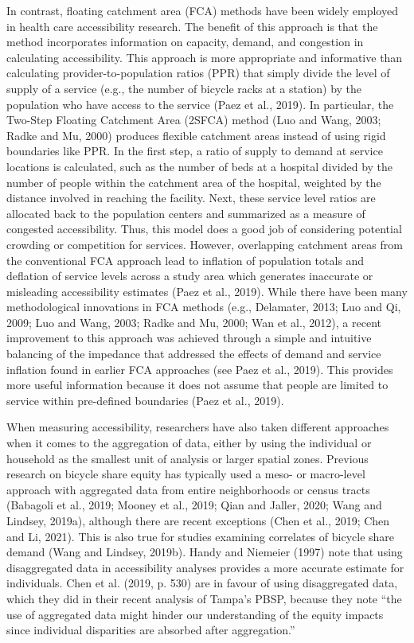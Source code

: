 \documentclass[]{elsarticle} %
\begin{document}
In contrast, floating catchment area (FCA) methods have been widely
employed in health care accessibility research. The benefit of this
approach is that the method incorporates information on capacity,
demand, and congestion in calculating accessibility. This approach is
more appropriate and informative than calculating provider-to-population
ratios (PPR) that simply divide the level of supply of a service (e.g.,
the number of bicycle racks at a station) by the population who have
access to the service (Paez et al., 2019). In particular, the Two-Step
Floating Catchment Area (2SFCA) method (Luo and Wang, 2003; Radke and
Mu, 2000) produces flexible catchment areas instead of using rigid
boundaries like PPR. In the first step, a ratio of supply to demand at
service locations is calculated, such as the number of beds at a
hospital divided by the number of people within the catchment area of
the hospital, weighted by the distance involved in reaching the
facility. Next, these service level ratios are allocated back to the
population centers and summarized as a measure of congested
accessibility. Thus, this model does a good job of considering potential
crowding or competition for services. However, overlapping catchment
areas from the conventional FCA approach lead to inflation of population
totals and deflation of service levels across a study area which
generates inaccurate or misleading accessibility estimates (Paez et al.,
2019). While there have been many methodological innovations in FCA
methods (e.g., Delamater, 2013; Luo and Qi, 2009; Luo and Wang, 2003;
Radke and Mu, 2000; Wan et al., 2012), a recent improvement to this
approach was achieved through a simple and intuitive balancing of the
impedance that addressed the effects of demand and service inflation
found in earlier FCA approaches (see Paez et al., 2019). This provides
more useful information because it does not assume that people are
limited to service within pre-defined boundaries (Paez et al., 2019).

When measuring accessibility, researchers have also taken different
approaches when it comes to the aggregation of data, either by using the
individual or household as the smallest unit of analysis or larger
spatial zones. Previous research on bicycle share equity has typically
used a meso- or macro-level approach with aggregated data from entire
neighborhoods or census tracts (Babagoli et al., 2019; Mooney et al.,
2019; Qian and Jaller, 2020; Wang and Lindsey, 2019a), although there
are recent exceptions (Chen et al., 2019; Chen and Li, 2021). This is
also true for studies examining correlates of bicycle share demand (Wang
and Lindsey, 2019b). Handy and Niemeier (1997) note that using
disaggregated data in accessibility analyses provides a more accurate
estimate for individuals. Chen et al. (2019, p. 530) are in favour of
using disaggregated data, which they did in their recent analysis of
Tampa's PBSP, because they note ``the use of aggregated data might
hinder our understanding of the equity impacts since individual
disparities are absorbed after aggregation.''
\end{document}

